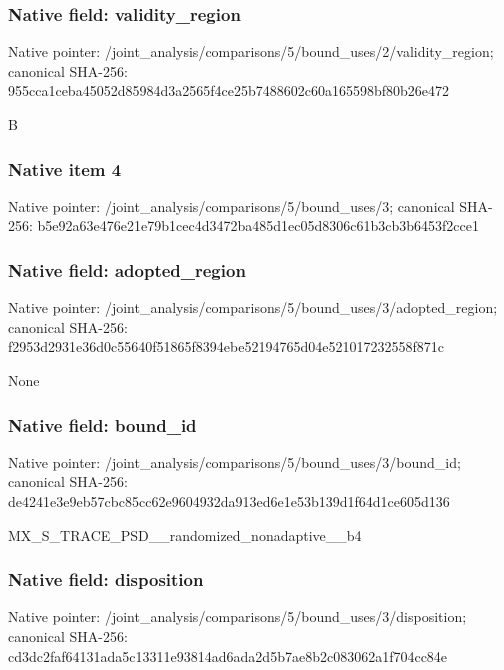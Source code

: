 \documentclass[10pt,a4paper]{article}
\begin{document}
\subsubsection{Native field: validity\_\allowbreak{}region}
Native pointer: /joint\_\allowbreak{}analysis/comparisons/5/bound\_\allowbreak{}uses/2/validity\_\allowbreak{}region; canonical SHA-256: 955cca1ceba45052d85984d3a2565f4ce25b7488602c60a165598bf80b26e472

\begingroup\raggedright\sloppy B\par\endgroup

\subsubsection{Native item 4}
Native pointer: /joint\_\allowbreak{}analysis/comparisons/5/bound\_\allowbreak{}uses/3; canonical SHA-256: b5e92a63e476e21e79b1cec4d3472ba485d1ec05d8306c61b3cb3b6453f2cce1

\subsubsection{Native field: adopted\_\allowbreak{}region}
Native pointer: /joint\_\allowbreak{}analysis/comparisons/5/bound\_\allowbreak{}uses/3/adopted\_\allowbreak{}region; canonical SHA-256: f2953d2931e36d0c55640f51865f8394ebe52194765d04e521017232558f871c

\begingroup\raggedright\sloppy None\par\endgroup

\subsubsection{Native field: bound\_\allowbreak{}id}
Native pointer: /joint\_\allowbreak{}analysis/comparisons/5/bound\_\allowbreak{}uses/3/bound\_\allowbreak{}id; canonical SHA-256: de4241e3e9eb57cbc85cc62e9604932da913ed6e1e53b139d1f64d1ce605d136

\begingroup\raggedright\sloppy MX\_\allowbreak{}S\_\allowbreak{}TRACE\_\allowbreak{}PSD\_\allowbreak{}\_\allowbreak{}randomized\_\allowbreak{}nonadaptive\_\allowbreak{}\_\allowbreak{}b4\par\endgroup

\subsubsection{Native field: disposition}
Native pointer: /joint\_\allowbreak{}analysis/comparisons/5/bound\_\allowbreak{}uses/3/disposition; canonical SHA-256: cd3dc2faf64131ada5c13311e93814ad6ada2d5b7ae8b2c083062a1f704cc84e
\end{document}
